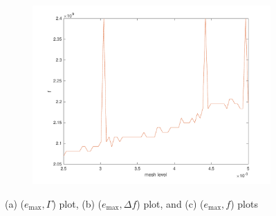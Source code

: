 \documentclass[12pt,a4paper]{article}
\begin{document}
{\begin{figure}[h]
\begin{center}
\begin{subfigure}{0.3\linewidth}
			\includegraphics[scale=0.3]{F_vs_mesh_level.pdf}
			\caption{}
			\label{eq:f vs mesh}
		\end{subfigure}
		\caption{\selectfont (a) ($e_{\max},\Gamma$) plot, (b) ($e_{\max},\Delta f$) plot, and (c) ($e_{\max},f$) plots} 
	\end{center}
\end{figure}
}
\end{document}
